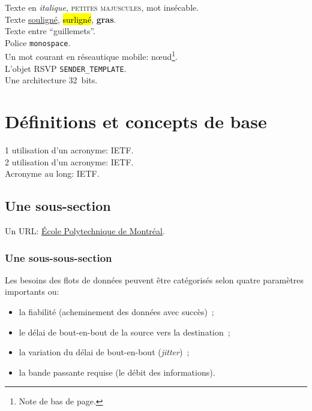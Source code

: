 \label{sec:Introduction}  %
Texte en \emph{italique}, \textsc{petites majuscules}, mot \mbox{insécable}.\\
Texte \ul{souligné}, \hl{surligné}, \textbf{gras}.\\
Texte entre ``guillemets''.\\
Police \texttt{monospace}.\\
Un mot courant en réseautique mobile: n\oe{}ud\footnote{Note de bas de page.}.\\
L'objet RSVP \texttt{SENDER\_TEMPLATE}.\\
Une architecture 32~bits.\\
\section{Définitions et concepts de base}  %
\begin{flushleft}
1\iere{} utilisation d'un acronyme: \ac{IETF}.\\
2\ieme{} utilisation d'un acronyme: \ac{IETF}.\\
Acronyme au long: \acl{IETF}.\\
\end{flushleft}

\subsection{Une sous-section}
Un URL: \href{http://www.polymtl.ca}{École Polytechnique de Montréal}.

\subsubsection{Une sous-sous-section}
Les besoins des flots de données peuvent être catégorisés selon
quatre paramètres importants \cite{Tanenbaum} ou:
\begin{itemize}
\item la fiabilité (acheminement des données avec succès)~;
\item le délai de \mbox{bout-en-bout} de la source vers la destination~;
\item la variation du délai de \mbox{bout-en-bout} (\emph{jitter})~;
\item la bande passante requise (le débit des informations).
\end{itemize}

